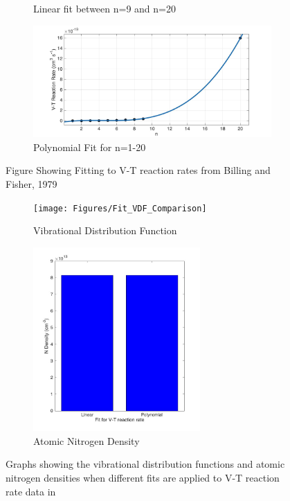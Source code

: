 \documentclass[11pt, oneside]{article}   	%
\begin{document}
\begin{figure}
\begin{subfigure}{0.5\textwidth}
\caption{Linear fit between n=9 and n=20}
\end{subfigure}
\begin{subfigure}{0.5\textwidth}
\includegraphics[width=\textwidth]{Figures/Polynomial}
\caption{Polynomial Fit for n=1-20}
\end{subfigure}
\caption{Figure Showing Fitting to V-T reaction rates from Billing and Fisher, 1979 \cite{Billing1979vv}}
\label{fig:fits}
\end{figure}

\begin{figure}
\begin{subfigure}{0.5\textwidth}
\texttt{[image: Figures/Fit\_VDF\_Comparison]}
\caption{Vibrational Distribution Function}
\label{subfig:VDF}
\end{subfigure}
\begin{subfigure}{0.5\textwidth}
\begin{center}
\includegraphics[width=0.7\textwidth]{Figures/Ndensity}
\caption{Atomic Nitrogen Density}
\end{center}
\end{subfigure}
\caption{Graphs showing the vibrational distribution functions and atomic nitrogen densities when different fits are applied to V-T reaction rate data in \cite{Billing1979vv}}
\label{fig:VDFandN}
\end{figure}
\end{document}
